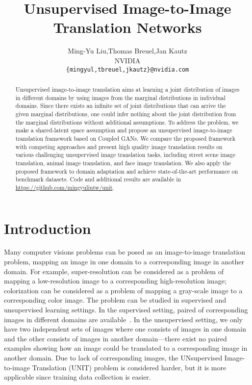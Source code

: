 \documentclass{article}
\title{Unsupervised Image-to-Image Translation Networks}
\author{
  Ming-Yu Liu,\quad Thomas Breuel,\quad Jan Kautz\\
  NVIDIA\\
  \texttt{\{mingyul,tbreuel,jkautz\}@nvidia.com} \\
}
\begin{document}
\maketitle

\begin{abstract}
Unsupervised image-to-image translation aims at learning a joint distribution of images in different domains by using images from the marginal distributions in individual domains. Since there exists an infinite set of joint distributions that can arrive the given marginal distributions, one could infer nothing about the joint distribution from the marginal distributions without additional assumptions. To address the problem, we make a shared-latent space assumption and propose an unsupervised image-to-image translation framework based on Coupled GANs. We compare the proposed framework with competing approaches and present high quality image translation results on various challenging unsupervised image translation tasks, including street scene image translation, animal image translation, and face image translation. We also apply the proposed framework to domain adaptation and achieve state-of-the-art performance on benchmark datasets. Code and additional results are available in \href{https://github.com/mingyuliutw/unit}{https://github.com/mingyuliutw/unit}.
\end{abstract}

\section{Introduction}

Many computer visions problems can be posed as an image-to-image translation problem, mapping an image in one domain to a corresponding image in another domain. For example, super-resolution can be considered as a problem of mapping a low-resolution image to a corresponding high-resolution image; colorization can be considered as a problem of mapping a gray-scale image to a corresponding color image. The problem can be studied in supervised and unsupervised learning settings. In the supervised setting, paired of corresponding images in different domains are available~\cite{isola2016image,ledig2016photo}. In the unsupervised setting, we only have two independent sets of images where one consists of images in one domain and the other consists of images in another domain---there exist no paired examples showing how an image could be translated to a corresponding image in another domain. Due to lack of corresponding images, the UNsupervised Image-to-image Translation (UNIT) problem is considered harder, but it is more applicable since training data collection is easier. 
\end{document}
